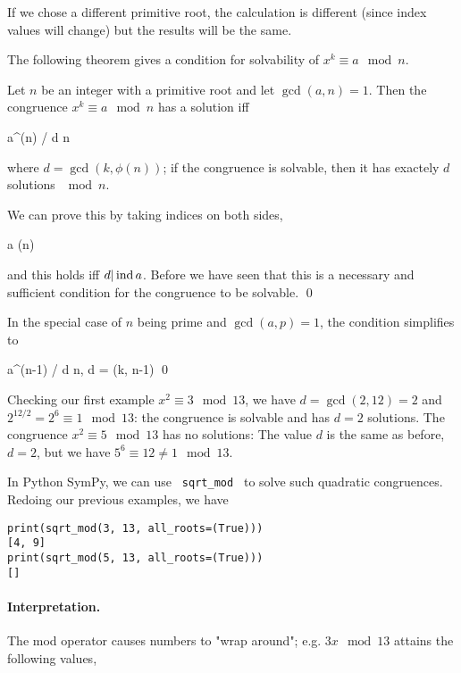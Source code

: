 \vspace{2mm}

If we chose a different primitive root, the calculation is different (since index values will change) but the results will be the same.

The following theorem gives a condition for solvability of $x^k \equiv a \mod n$.

\begin{theorem}
Let $n$ be an integer with a primitive root and let $\gcd(a,n) = 1$. Then the congruence $x^k \equiv a \mod n$ has a solution iff

\bee
a^{\phi(n) / d}  \mod n
\eee

where $d = \gcd(k, \phi(n))$; if the congruence is solvable, then it has exactely $d$ solutions $\mod n$.
\end{theorem}

We can prove this by taking indices on both sides,

\bee
{} \ind a  \mod \phi(n)
\eee

and this holds iff $d |\operatorname{ind} a$. Before we have seen that this is a necessary and sufficient condition for the congruence to be solvable. \qed

In the special case of $n$ being prime and $\gcd(a,p) = 1$, the condition simplifies to

\bee
a^{(n-1) / d}  \mod n, \quad d = \gcd(k, n-1) \qed
\eee

Checking our first example $x^2 \equiv 3 \mod 13$, we have $d = \gcd(2, 12) = 2$ and $2^{12/2} = 2^6 \equiv 1 \mod 13$: the congruence is solvable and has $d = 2$ solutions. The congruence $x^2 \equiv 5 \mod 13$ has no solutions: The value $d$ is the same as before, $d = 2$, but we have $5^6 \equiv 12 \neq 1 \mod 13$.

In Python SymPy, we can use \verb+ sqrt_mod + to solve such quadratic congruences. Redoing our previous examples, we have

\begin{verbatim}
print(sqrt_mod(3, 13, all_roots=(True)))
[4, 9]
print(sqrt_mod(5, 13, all_roots=(True)))
[]
\end{verbatim}

\paragraph{Interpretation.} The mod operator causes numbers to "wrap around"; e.g. $3x \mod 13$ attains the following values,

